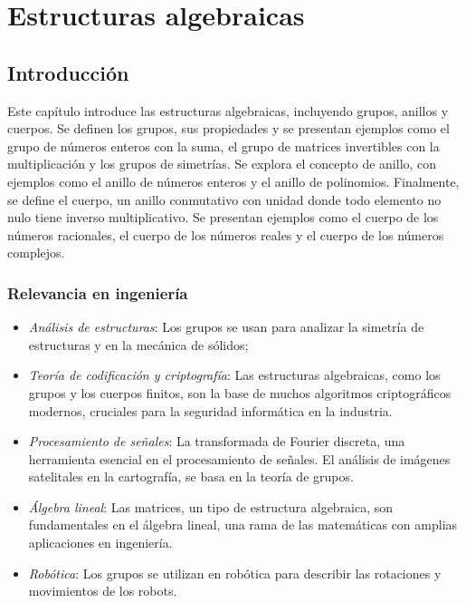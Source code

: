 \chapter{Estructuras algebraicas}

\section{Introducción}

Este capítulo introduce las estructuras algebraicas, incluyendo grupos, anillos y cuerpos. Se definen los grupos, sus propiedades y se presentan ejemplos como el grupo de números enteros con la suma, el grupo de matrices invertibles con la multiplicación y los grupos de simetrías.
Se explora el concepto de anillo, con ejemplos como el anillo de números enteros y el anillo de polinomios. Finalmente, se define el cuerpo, un anillo conmutativo con unidad donde todo elemento no nulo tiene inverso multiplicativo. Se presentan ejemplos como el cuerpo de los números racionales, el cuerpo de los números reales y el cuerpo de los números complejos.

\subsection{Relevancia en ingeniería}

\begin{itemize}
	\item \textit{Análisis de estructuras}: Los grupos se usan para analizar la simetría de estructuras y en la mecánica de sólidos;
	\item \textit{Teoría de codificación y criptografía}: Las estructuras algebraicas, como los grupos y los cuerpos finitos, son la base de muchos algoritmos criptográficos modernos, cruciales para la seguridad informática en la industria.
	\item \textit{Procesamiento de señales}: La transformada de Fourier discreta, una herramienta esencial en el procesamiento de señales. El análisis de imágenes satelitales en la cartografía, se basa en la teoría de grupos.
	\item \textit{Álgebra lineal}:  Las matrices, un tipo de estructura algebraica, son fundamentales en el álgebra lineal, una rama de las matemáticas con amplias aplicaciones en ingeniería.
	\item \textit{Robótica}: Los grupos se utilizan en robótica para describir las rotaciones y movimientos de los robots.
\end{itemize}

